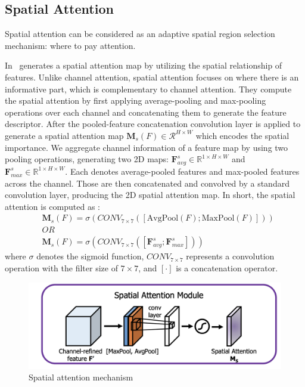 \subsection{Spatial Attention}
Spatial attention can be considered as an adaptive spatial region selection mechanism: where to pay attention.

In~\cite{woo2018cbam} generates a spatial attention map by utilizing the spatial relationship of features. Unlike channel attention, spatial attention focuses on where there is an informative part, which is complementary to channel attention. They compute the spatial attention by first applying average-pooling and max-pooling operations over each channel and concatenating them to generate the feature descriptor. After the pooled-feature concatenation convolution layer is applied to generate a spatial attention map $\textbf{M}_{s}\left(F\right) \in \mathcal{R}^{H×W}$ which encodes the spatial importance.
We aggregate channel information of a feature map by using two pooling operations, generating two 2D maps:
$\mathbf{F}^{s}_{avg} \in \mathbb{R}^{1\times{H}\times{W}}$
and $\mathbf{F}^{s}_{max} \in \mathbb{R}^{1\times{H}\times{W}}$. Each denotes average-pooled features and max-pooled features across the channel. Those are then concatenated and convolved by a standard convolution layer, producing the 2D spatial attention map. In short, the spatial attention is computed as \cite{chen2017sca}:
\begin{equation}\begin{split}
    &\textbf{M}_{s}\left(F\right) = \sigma\left(CONV_{7\times7}\left(\left[\text{AvgPool}\left(F\right);\text{MaxPool}\left(F\right)\right]\right)\right) \\
    &OR\\
    & \textbf{M}_{s}\left(F\right) = \sigma\left(CONV_{7\times7}\left(\left[\mathbf{F}^{s}_{avg};\mathbf{F}^{s}_{max} \right]\right)\right) 
\end{split}\end{equation}
where $\sigma$ denotes the sigmoid function,  $CONV_{7\times7}$ represents a convolution operation with the filter size of $7\times7$, and $[\cdot]$ is a concatenation operator.
\begin{figure}
    \begin{center}
        \includegraphics[width=\textwidth]{Figures/SpatialAttentionExample.png}
        \caption{\label{fig:spattex} Spatial attention mechanism }
    \end{center}
\end{figure}

